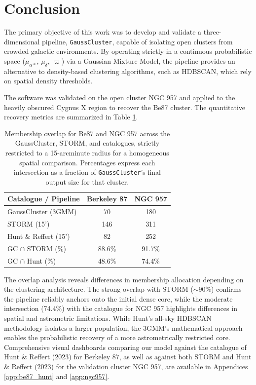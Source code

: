 \documentclass{CU_IOPStyle_PXT999}
\begin{document}
\section{Conclusion}
\label{ssec:5}

The primary objective of this work was to develop and validate a three-dimensional pipeline, \texttt{GaussCluster}, capable of isolating open clusters from crowded galactic environments. By operating strictly in a continuous probabilistic space ($\mu_{\alpha*}$, $\mu_{\delta}$, $\varpi$) via a Gaussian Mixture Model, the pipeline provides an alternative to density-based clustering algorithms, such as HDBSCAN, which rely on spatial density thresholds. 

The software was validated on the open cluster NGC 957 and applied to the heavily obscured Cygnus X region to recover the Be87 cluster. The quantitative recovery metrics are summarized in Table \ref{tab:membership_overlap}.

\begin{table}[!h]
    \centering
    \caption{Membership overlap for Be87 and NGC 957 across the GaussCluster, STORM, and \cite{hunt_improving_2023} catalogues, strictly restricted to a 15-arcminute radius for a homogeneous spatial comparison. Percentages express each intersection as a fraction of \texttt{GaussCluster}'s final output size for that cluster.}
    \vspace{0.2cm}
    \begin{tabular}{lcc}
        \hline\hline
        Catalogue / Pipeline & Berkeley 87 & NGC 957 \\
        \hline
        GaussCluster (3GMM) & 70 & 180 \\
        STORM (15') & 146 & 311 \\
        Hunt \& Reffert (15') & 82 & 252 \\
        \hline
        GC $\cap$ STORM (\%)  & 88.6\% & 91.7\% \\
        GC $\cap$ Hunt (\%)  & 48.6\% & 74.4\% \\
        \hline\hline
    \end{tabular}
    \label{tab:membership_overlap}
\end{table}

The overlap analysis reveals differences in membership allocation depending on the clustering architecture. The strong overlap with STORM ($\sim 90$\%) confirms the pipeline reliably anchors onto the initial dense core, while the moderate intersection (74.4\%) with the \cite{hunt_improving_2023} catalogue for NGC 957 highlights differences in spatial and astrometric limitations. While Hunt's all-sky HDBSCAN methodology isolates a larger population, the 3GMM's mathematical approach enables the probabilistic recovery of a more astrometrically restricted core. Comprehensive visual dashboards comparing our model against the catalogue of Hunt \& Reffert (2023) for Berkeley 87, as well as against both STORM and Hunt \& Reffert (2023) for the validation cluster NGC 957, are available in Appendices \ref{app:be87_hunt} and \ref{app:ngc957}.
\end{document}

